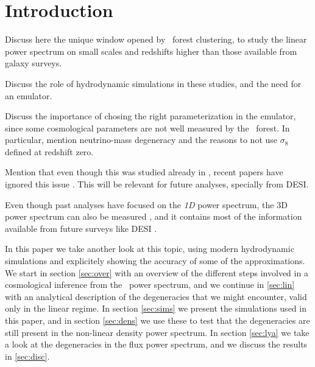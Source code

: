 \section{Introduction} 

Discuss here the unique window opened by \lya\ forest clustering, to study 
the linear power spectrum on small scales and redshifts higher than those 
available from galaxy surveys.

Discuss the role of hydrodynamic simulations in these studies, and the need 
for an emulator.

Discuss the importance of chosing the right parameterization in the emulator, 
since some cosmological parameters are not well measured by the \lya\ forest.
In particular, mention neutrino-mass degeneracy and the reasons to not use 
$\sigma_8$ defined at redshift zero.

Mention that even though this was studied already in \cite{McDonald2005a}, 
recent papers have ignored this issue \cite{Palanque-Delabrouille2015,
Yeche2017}. 
This will be relevant for future analyses, specially from DESI.

Even though past analyses have focused on the \textit{1D} power spectrum, 
the 3D power spectrum can also be measured \cite{Font-Ribera2018}, 
and it contains most of the information available from future surveys 
like DESI \cite{Font-Ribera2014}. 

In this paper we take another look at this topic, using modern hydrodynamic 
simulations and explicitely showing the accuracy of some of the approximations.
We start in section \ref{sec:over} with an overview of the different steps 
involved in a cosmological inference from the \lya\ power spectrum, and we 
continue in \ref{sec:lin} with an analytical description of the degeneracies
that we might encounter, valid only in the linear regime.
In section \ref{sec:sims} we present the simulations used in this paper, and 
in section \ref{sec:dens} we use these to test that the degeneracies are 
still present in the non-linear density power spectrum. 
In section \ref{sec:lya} we take a look at the degeneracies in the flux 
power spectrum, and we discuss the results in \ref{sec:disc}.

 
